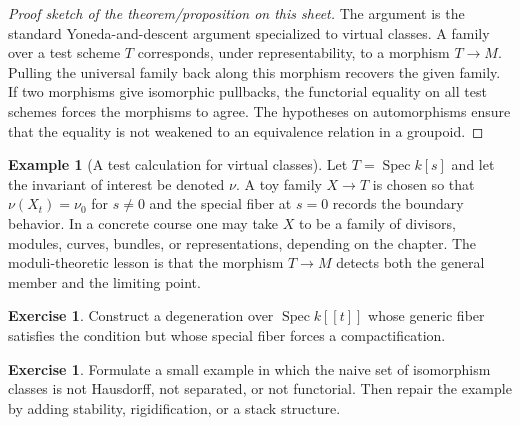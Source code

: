 \documentclass[11pt]{amsart}
\theoremstyle{definition}
\newtheorem{example}[theorem]{Example}
\newtheorem{exercise}[theorem]{Exercise}
\newcommand{\Spec}{\operatorname{Spec}}
\begin{document}
\begin{proof}[Proof sketch of the theorem/proposition on this sheet]
The argument is the standard Yoneda-and-descent argument specialized to virtual classes.  A family over a test scheme $T$ corresponds, under representability, to a morphism $T\to M$.  Pulling the universal family back along this morphism recovers the given family.  If two morphisms give isomorphic pullbacks, the functorial equality on all test schemes forces the morphisms to agree.  The hypotheses on automorphisms ensure that the equality is not weakened to an equivalence relation in a groupoid.
\end{proof}
\begin{example}[A test calculation for virtual classes]
Let $T=\Spec k[s]$ and let the invariant of interest be denoted $\nu$.  A toy family $X\to T$ is chosen so that $\nu(X_t)=\nu_0$ for $s\ne0$ and the special fiber at $s=0$ records the boundary behavior.  In a concrete course one may take $X$ to be a family of divisors, modules, curves, bundles, or representations, depending on the chapter.  The moduli-theoretic lesson is that the morphism $T\to M$ detects both the general member and the limiting point.
\end{example}
\begin{exercise}
Construct a degeneration over $\Spec k[[t]]$ whose generic fiber satisfies the condition but whose special fiber forces a compactification.
\end{exercise}
\begin{exercise}
Formulate a small example in which the naive set of isomorphism classes is not Hausdorff, not separated, or not functorial.  Then repair the example by adding stability, rigidification, or a stack structure.
\end{exercise}
\clearpage
\end{document}
